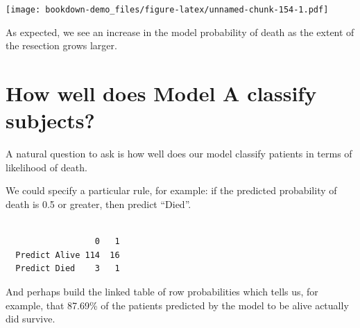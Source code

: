\documentclass[]{book}
\newenvironment{Shaded}{\begin{snugshade}}{\end{snugshade}}
\newcommand{\KeywordTok}[1]{\textcolor[rgb]{0.13,0.29,0.53}{\textbf{#1}}}
\newcommand{\DecValTok}[1]{\textcolor[rgb]{0.00,0.00,0.81}{#1}}
\newcommand{\FloatTok}[1]{\textcolor[rgb]{0.00,0.00,0.81}{#1}}
\newcommand{\StringTok}[1]{\textcolor[rgb]{0.31,0.60,0.02}{#1}}
\newcommand{\OperatorTok}[1]{\textcolor[rgb]{0.81,0.36,0.00}{\textbf{#1}}}
\newcommand{\NormalTok}[1]{#1}
\theoremstyle{definition}
\theoremstyle{definition}
\theoremstyle{definition}
\theoremstyle{remark}
\begin{document}
\texttt{[image: bookdown-demo\_files/figure-latex/unnamed-chunk-154-1.pdf]}

As expected, we see an increase in the model probability of death as the
extent of the resection grows larger.

\section{How well does Model A classify
subjects?}\label{how-well-does-model-a-classify-subjects}

A natural question to ask is how well does our model classify patients
in terms of likelihood of death.

We could specify a particular rule, for example: if the predicted
probability of death is 0.5 or greater, then predict ``Died''.

\begin{Shaded}
\end{Shaded}

\begin{verbatim}
               
                  0   1
  Predict Alive 114  16
  Predict Died    3   1
\end{verbatim}

And perhaps build the linked table of row probabilities which tells us,
for example, that 87.69\% of the patients predicted by the model to be
alive actually did survive.

\begin{Shaded}
\end{Shaded}
\end{document}
